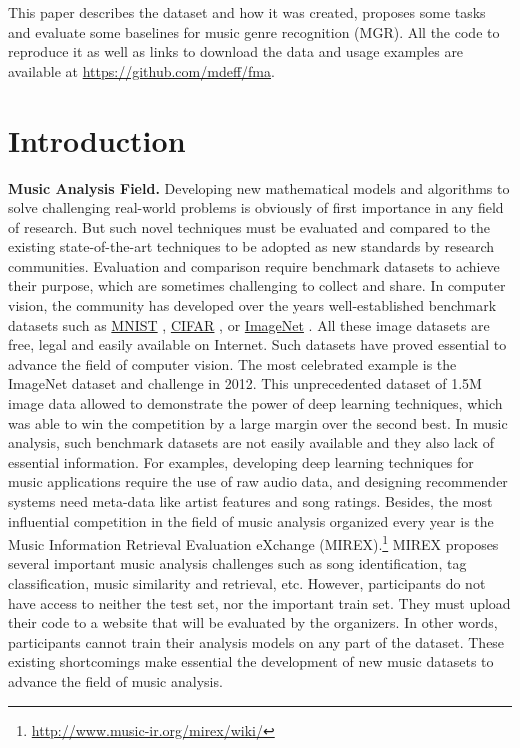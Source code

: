 \documentclass{article}
\begin{document}
This paper describes the dataset and how it was created, proposes some tasks and evaluate some baselines for music genre recognition (MGR).
All the code to reproduce it as well as links to download the data and usage examples are available at \url{https://github.com/mdeff/fma}.


\section{Introduction} %


\noindent
{\bf Music Analysis Field.} Developing new mathematical models and algorithms to solve challenging real-world problems is obviously of first importance in any field of research. But such novel techniques must be evaluated and compared to the existing state-of-the-art techniques to be adopted as new standards by research communities. Evaluation and comparison require benchmark datasets to achieve their purpose, which are sometimes challenging to collect and share. In computer vision, the community has developed over the years well-established benchmark datasets such as \href{http://yann.lecun.com/exdb/mnist/}{MNIST} \cite{mnist}, \href{https://www.cs.toronto.edu/~kriz/cifar.html}{CIFAR} \cite{cifar}, or \href{http://www.image-net.org}{ImageNet} \cite{imagenet}. All these image datasets are free, legal and easily available on Internet. Such datasets have proved essential to advance the field of computer vision. The most celebrated example is the ImageNet dataset and challenge in 2012. This unprecedented dataset of 1.5M image data allowed to demonstrate the power of deep learning techniques, which was able to win the competition by a large margin over the second best. In music analysis, such benchmark datasets are not easily available and they also lack of essential information. For examples, developing deep learning techniques for music applications require the use of raw audio data, and designing recommender systems need meta-data like artist features and song ratings. Besides, the most influential competition in the field of music analysis organized every year is the Music Information Retrieval Evaluation eXchange (MIREX).\footnote{\url{http://www.music-ir.org/mirex/wiki/}} MIREX proposes several important music analysis challenges such as song identification, tag classification, music similarity and retrieval, etc. However, participants do not have access to neither the test set, nor the important train set. They must upload their code to a website that will be evaluated by the organizers. In other words, participants cannot train their analysis models on any part of the dataset. These existing shortcomings make essential the development of new music datasets to advance the field of music analysis.   \\
\end{document}
